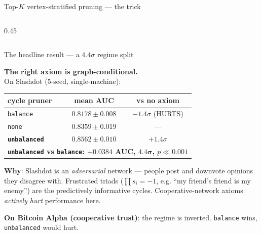 \documentclass[10pt,aspectratio=169]{beamer}
\newcommand{\code}[1]{\texttt{\small #1}}
\begin{document}
\begin{frame}{Top-$K$ vertex-stratified pruning --- the trick}
\begin{columns}[T]
\begin{column}{0.45\textwidth}
\end{column}
\end{columns}

\end{frame}

\begin{frame}{The headline result --- a $4.4\sigma$ regime split}

\textbf{The right axiom is graph-conditional.}\\
On Slashdot (5-seed, single-machine):

\begin{center}
\begin{tabular}{l c c}
\toprule
\textbf{cycle pruner} & \textbf{mean AUC} & \textbf{vs no axiom} \\
\midrule
\code{balance}    & $0.8178 \pm 0.008$  & \textcolor{deepred}{$-1.4\sigma$ (HURTS)} \\
\code{none}       & $0.8359 \pm 0.019$  & --- \\
\textbf{\code{unbalanced}} & $\mathbf{0.8562 \pm 0.010}$  & \textcolor{deepgreen}{$+1.4\sigma$} \\
\bottomrule
\multicolumn{3}{r}{\textbf{\code{unbalanced} vs \code{balance}: $+0.0384$ AUC, $\boldsymbol{4.4\sigma}$, $p \ll 0.001$}}\\
\end{tabular}
\end{center}

\medskip

\textbf{Why}: Slashdot is an \emph{adversarial} network --- people
post and downvote opinions they disagree with. Frustrated triads
($\prod s_i = -1$, e.g. ``my friend's friend is my enemy'') are the
predictively informative cycles. Cooperative-network axioms
\emph{actively hurt} performance here.

\medskip

\textbf{On Bitcoin Alpha (cooperative trust)}: the regime is
inverted. \code{balance} wins, \code{unbalanced} would hurt.

\medskip
{}
\end{frame}
\end{document}
